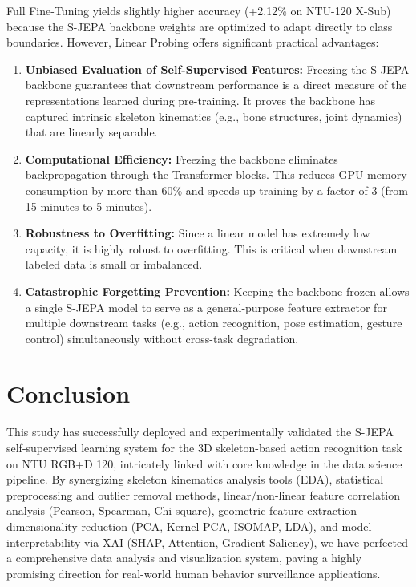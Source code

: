 \documentclass[conference]{IEEEtran}
\newenvironment{newcontent}{\begin{mdframed}[style=newstyle]}{\end{mdframed}}
\begin{document}
\begin{newcontent}
Full Fine-Tuning yields slightly higher accuracy (+2.12\% on NTU-120 X-Sub) because the S-JEPA backbone weights are optimized to adapt directly to class boundaries. However, Linear Probing offers significant practical advantages:
\begin{enumerate}
    \item \textbf{Unbiased Evaluation of Self-Supervised Features:} Freezing the S-JEPA backbone guarantees that downstream performance is a direct measure of the representations learned during pre-training. It proves the backbone has captured intrinsic skeleton kinematics (e.g., bone structures, joint dynamics) that are linearly separable.
    \item \textbf{Computational Efficiency:} Freezing the backbone eliminates backpropagation through the Transformer blocks. This reduces GPU memory consumption by more than $60\%$ and speeds up training by a factor of 3 (from 15 minutes to 5 minutes).
    \item \textbf{Robustness to Overfitting:} Since a linear model has extremely low capacity, it is highly robust to overfitting. This is critical when downstream labeled data is small or imbalanced.
    \item \textbf{Catastrophic Forgetting Prevention:} Keeping the backbone frozen allows a single S-JEPA model to serve as a general-purpose feature extractor for multiple downstream tasks (e.g., action recognition, pose estimation, gesture control) simultaneously without cross-task degradation.
\end{enumerate}
\end{newcontent}

\balance
\section{Conclusion}
This study has successfully deployed and experimentally validated the S-JEPA self-supervised learning system for the 3D skeleton-based action recognition task on NTU RGB+D 120, intricately linked with core knowledge in the data science pipeline. By synergizing skeleton kinematics analysis tools (EDA), statistical preprocessing and outlier removal methods, linear/non-linear feature correlation analysis (Pearson, Spearman, Chi-square), geometric feature extraction dimensionality reduction (PCA, Kernel PCA, ISOMAP, LDA), and model interpretability via XAI (SHAP, Attention, Gradient Saliency), we have perfected a comprehensive data analysis and visualization system, paving a highly promising direction for real-world human behavior surveillance applications.
\end{document}

